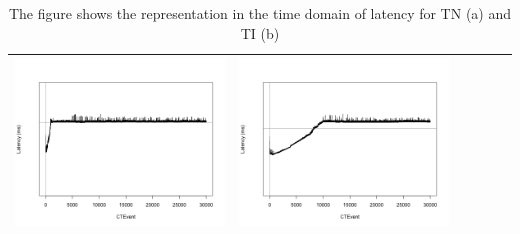 \begin{table}[htbp]
{\begin{tabular}{l | ccccc}
\begin{minipage}{.15\textwidth}
     			 	\includegraphics[width=\linewidth]{images/lat-log-triple/I14}
    				 \end{minipage}
    			   &	 \begin{minipage}{.15\textwidth}\vspace{2pt}     							
     			 	\includegraphics[width=\linewidth]{images/lat-log-triple/I15}
    				 \end{minipage}\\
		\hline %
	 \end{tabular}
	}
	\caption[\textsc{Analyser} Investigation Stack - Level 2 - Pattern Identification - Latency - Baselines TN and TI]{The figure shows the  representation in the time domain of latency for TN (a) and TI (b)}  
 	\label{tab:level2-latency-triple}
	\end{table}